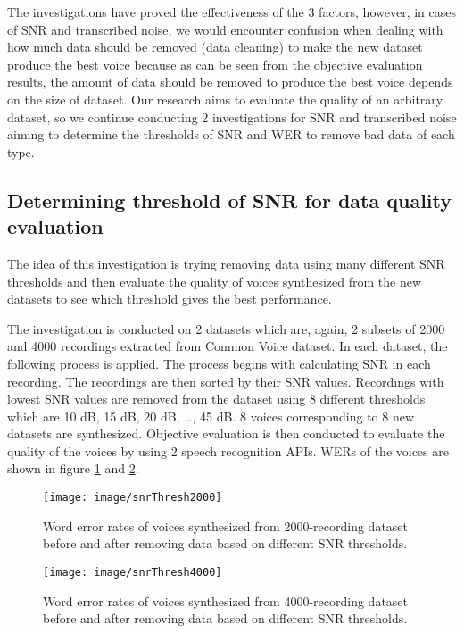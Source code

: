 \documentclass[12pt]{article}
\begin{document}
The investigations have proved the effectiveness of the 3 factors, however, in cases of SNR and transcribed noise, we would encounter confusion when dealing with how much data should be removed (data cleaning) to make the new dataset produce the best voice because as can be seen from the objective evaluation results, the amount of data should be removed to produce the best voice depends on the size of dataset. Our research aims to evaluate the quality of an arbitrary dataset, so we continue conducting 2 investigations for SNR and transcribed noise aiming to determine the thresholds of SNR and WER to remove bad data of each type.

\subsection{Determining threshold of SNR for data quality evaluation}
The idea of this investigation is trying removing data using many different SNR thresholds and then evaluate the quality of voices synthesized from the new datasets to see which threshold gives the best performance.

The investigation is conducted on 2 datasets which are, again, 2 subsets of 2000 and 4000 recordings extracted from Common Voice dataset. In each dataset, the following process is applied. The process begins with calculating SNR in each recording. The recordings are then sorted by their SNR values. Recordings with lowest SNR values are removed from the dataset using 8 different thresholds which are 10 dB, 15 dB, 20 dB, …, 45 dB. 8 voices corresponding to 8 new datasets are synthesized. Objective evaluation is then conducted to evaluate the quality of the voices by using 2 speech recognition APIs. WERs of the voices are shown in figure \ref{fig_snrThresh2000} and \ref{fig_snrThresh4000}.

\begin{figure}[t]
\begin{center}
\texttt{[image: image/snrThresh2000]}
\end{center}
\vspace{-0.3cm}
\caption[SNR thresholds 2000.]{Word error rates of voices synthesized from 2000-recording dataset before and after removing data based on different SNR thresholds.}
\label{fig_snrThresh2000}
\end{figure}

\begin{figure}[t]
\begin{center}
\texttt{[image: image/snrThresh4000]}
\end{center}
\vspace{-0.3cm}
\caption[SNR thresholds 4000.]{Word error rates of voices synthesized from 4000-recording dataset before and after removing data based on different SNR thresholds.}
\label{fig_snrThresh4000}
\end{figure}
\end{document}
